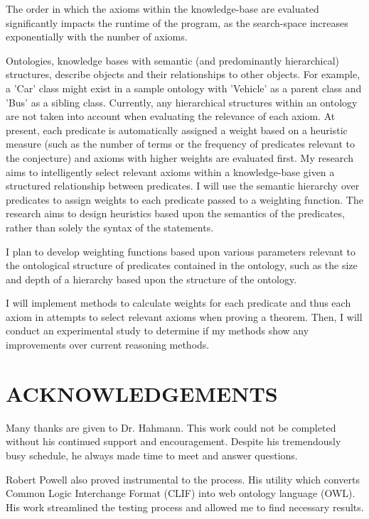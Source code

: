 \documentclass{article}
\begin{document}
The order in which the axioms within the knowledge-base are evaluated significantly impacts the runtime of the program, as the search-space increases exponentially with the number of axioms. 

Ontologies, knowledge bases with semantic (and predominantly hierarchical) structures, describe objects and their relationships to other objects. For example, a 'Car' class might exist in a sample ontology with 'Vehicle' as a parent class and 'Bus' as a sibling class. Currently, any hierarchical structures within an ontology are not taken into account when evaluating the relevance of each axiom. At present, each predicate is automatically assigned a weight based on a heuristic measure (such as the number of terms or the frequency of predicates relevant to the conjecture) and axioms with higher weights are evaluated first. My research aims to intelligently select relevant axioms within a knowledge-base given a structured relationship between predicates. I will use the semantic hierarchy over predicates to assign weights to each predicate passed to a weighting function. The research aims to design heuristics based upon the semantics of the predicates, rather than solely the syntax of the statements. 

I plan to develop weighting functions based upon various parameters relevant to the ontological structure of predicates contained in the ontology, such as the size and depth of a hierarchy based upon the structure of the ontology. 

I will implement methods to calculate weights for each predicate and thus each axiom in attempts to select relevant axioms when proving a theorem. Then, I will conduct an experimental study to determine if my methods show any improvements over current reasoning methods.
	
\setcounter{page}{3}
\newpage
{}
\vspace*{.05in}
\section*{\MakeUppercase{Acknowledgements}}
        
Many thanks are given to Dr. Hahmann. This work could not be completed without his continued support and encouragement. Despite his tremendously busy schedule, he always made time to meet and answer questions. 

Robert Powell also proved instrumental to the process. His utility which converts Common Logic Interchange Format (CLIF) into web ontology language (OWL). His work streamlined the testing process and allowed me to find necessary results. 
\end{document}

